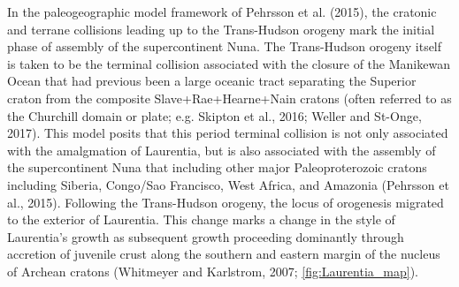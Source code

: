 \documentclass[11pt,letterpaper]{article}
\begin{document}
In the paleogeographic model framework of Pehrsson et al. (2015), the cratonic and terrane collisions leading up to the Trans-Hudson orogeny mark the initial phase of assembly of the supercontinent Nuna. The Trans-Hudson orogeny itself is taken to be the terminal collision associated with the closure of the Manikewan Ocean that had previous been a large oceanic tract separating the Superior craton from the composite Slave+Rae+Hearne+Nain cratons (often referred to as the Churchill domain or plate; e.g. Skipton et al., 2016; Weller and St-Onge, 2017). This model posits that this period terminal collision is not only associated with the amalgmation of Laurentia, but is also associated with the assembly of the supercontinent Nuna that including other major Paleoproterozoic cratons including Siberia, Congo/Sao Francisco, West Africa, and Amazonia (Pehrsson et al., 2015). Following the Trans-Hudson orogeny, the locus of orogenesis migrated to the exterior of Laurentia. This change marks a change in the style of Laurentia's growth as subsequent growth proceeding dominantly through accretion of juvenile crust along the southern and eastern margin of the nucleus of Archean cratons (Whitmeyer and Karlstrom, 2007; \ref{fig:Laurentia_map}). 

\end{document}
